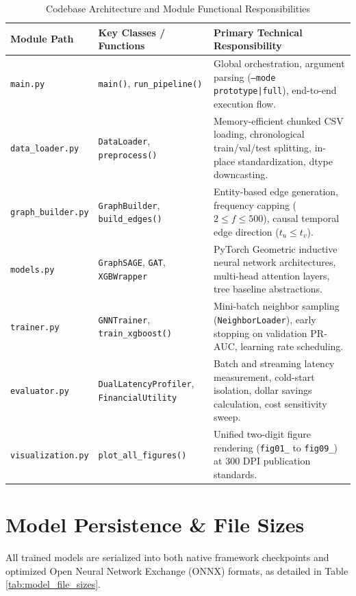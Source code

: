 \documentclass[11pt,a4paper]{report}
\begin{document}
\begin{table}[H]
\centering
\caption{Codebase Architecture and Module Functional Responsibilities}
\label{tab:module_responsibilities}
\begin{tabular}{llp{7.5cm}}
\toprule
\textbf{Module Path} & \textbf{Key Classes / Functions} & \textbf{Primary Technical Responsibility} \\
\midrule
\texttt{main.py} & \texttt{main()}, \texttt{run\_pipeline()} & Global orchestration, argument parsing (\texttt{--mode prototype|full}), end-to-end execution flow. \\
\texttt{data\_loader.py} & \texttt{DataLoader}, \texttt{preprocess()} & Memory-efficient chunked CSV loading, chronological train/val/test splitting, in-place standardization, dtype downcasting. \\
\texttt{graph\_builder.py} & \texttt{GraphBuilder}, \texttt{build\_edges()} & Entity-based edge generation, frequency capping ($2 \leq f \leq 500$), causal temporal edge direction ($t_u \leq t_v$). \\
\texttt{models.py} & \texttt{GraphSAGE}, \texttt{GAT}, \texttt{XGBWrapper} & PyTorch Geometric inductive neural network architectures, multi-head attention layers, tree baseline abstractions. \\
\texttt{trainer.py} & \texttt{GNNTrainer}, \texttt{train\_xgboost()} & Mini-batch neighbor sampling (\texttt{NeighborLoader}), early stopping on validation PR-AUC, learning rate scheduling. \\
\texttt{evaluator.py} & \texttt{DualLatencyProfiler}, \texttt{FinancialUtility} & Batch and streaming latency measurement, cold-start isolation, dollar savings calculation, cost sensitivity sweep. \\
\texttt{visualization.py} & \texttt{plot\_all\_figures()} & Unified two-digit figure rendering (\texttt{fig01\_} to \texttt{fig09\_}) at 300 DPI publication standards. \\
\bottomrule
\end{tabular}
\end{table}

\newpage
\section{Model Persistence \& File Sizes}
All trained models are serialized into both native framework checkpoints and optimized Open Neural Network Exchange (ONNX) formats, as detailed in Table \ref{tab:model_file_sizes}.
\end{document}
